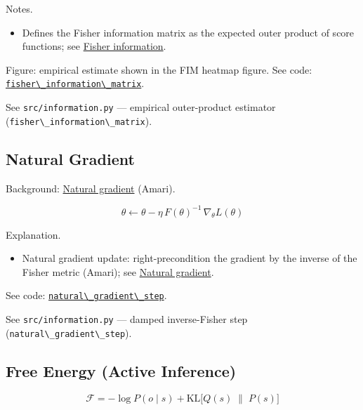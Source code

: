 \documentclass[
  10pt,
]{article}
\newcommand{\passthrough}[1]{#1}
\providecommand{\tightlist}{%
  \setlength{\itemsep}{0pt}\setlength{\parskip}{0pt}}
\begin{document}
Notes.

\begin{itemize}
\tightlist
\item
  Defines the Fisher information matrix as the expected outer product of
  score functions; see
  \href{https://en.wikipedia.org/wiki/Fisher_information}{Fisher
  information}.
\end{itemize}

Figure: empirical estimate shown in the FIM heatmap figure. See code:
\href{03_quadray_methods.md\#code:fisher_information_matrix}{\passthrough{\lstinline!fisher\_information\_matrix!}}.

See \passthrough{\lstinline!src/information.py!} --- empirical
outer-product estimator
(\passthrough{\lstinline!fisher\_information\_matrix!}).

\hypertarget{eq:natgrad}{%
\subsection{Natural Gradient}\label{eq:natgrad}}

Background:
\href{https://en.wikipedia.org/wiki/Natural_gradient}{Natural gradient}
(Amari).

\begin{equation}\label{eq:supp_natgrad}
\theta \leftarrow \theta - \eta\, F(\theta)^{-1}\, \nabla_{\theta} L(\theta)
\end{equation}

Explanation.

\begin{itemize}
\tightlist
\item
  Natural gradient update: right-precondition the gradient by the
  inverse of the Fisher metric (Amari); see
  \href{https://en.wikipedia.org/wiki/Natural_gradient}{Natural
  gradient}.
\end{itemize}

See code:
\href{03_quadray_methods.md\#code:natural_gradient_step}{\passthrough{\lstinline!natural\_gradient\_step!}}.

See \passthrough{\lstinline!src/information.py!} --- damped
inverse-Fisher step (\passthrough{\lstinline!natural\_gradient\_step!}).

\hypertarget{eq:free_energy}{%
\subsection{Free Energy (Active Inference)}\label{eq:free_energy}}

\begin{equation}\label{eq:supp_free_energy}
\mathcal{F} = -\log P(o\mid s) + \mathrm{KL}\big[ Q(s)\;\|\; P(s) \big]
\end{equation}
\end{document}
